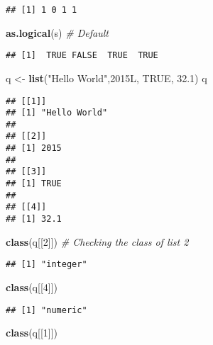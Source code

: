 \documentclass[
]{article}
\newenvironment{Shaded}{\begin{snugshade}}{\end{snugshade}}
\newcommand{\CommentTok}[1]{\textcolor[rgb]{0.56,0.35,0.01}{\textit{#1}}}
\newcommand{\ConstantTok}[1]{\textcolor[rgb]{0.56,0.35,0.01}{#1}}
\newcommand{\DataTypeTok}[1]{\textcolor[rgb]{0.13,0.29,0.53}{#1}}
\newcommand{\DecValTok}[1]{\textcolor[rgb]{0.00,0.00,0.81}{#1}}
\newcommand{\FloatTok}[1]{\textcolor[rgb]{0.00,0.00,0.81}{#1}}
\newcommand{\FunctionTok}[1]{\textcolor[rgb]{0.13,0.29,0.53}{\textbf{#1}}}
\newcommand{\NormalTok}[1]{#1}
\newcommand{\OtherTok}[1]{\textcolor[rgb]{0.56,0.35,0.01}{#1}}
\newcommand{\StringTok}[1]{\textcolor[rgb]{0.31,0.60,0.02}{#1}}
\begin{document}
\begin{verbatim}
## [1] 1 0 1 1
\end{verbatim}

\begin{Shaded}
\begin{Highlighting}[]
\FunctionTok{as.logical}\NormalTok{(s) }\CommentTok{\# Default }
\end{Highlighting}
\end{Shaded}

\begin{verbatim}
## [1]  TRUE FALSE  TRUE  TRUE
\end{verbatim}

\begin{Shaded}
\begin{Highlighting}[]
\NormalTok{q }\OtherTok{\textless{}{-}} \FunctionTok{list}\NormalTok{(}\StringTok{"Hello World"}\NormalTok{,}\DecValTok{2015}\DataTypeTok{L}\NormalTok{, }\ConstantTok{TRUE}\NormalTok{, }\FloatTok{32.1}\NormalTok{)}
\NormalTok{q}
\end{Highlighting}
\end{Shaded}

\begin{verbatim}
## [[1]]
## [1] "Hello World"
## 
## [[2]]
## [1] 2015
## 
## [[3]]
## [1] TRUE
## 
## [[4]]
## [1] 32.1
\end{verbatim}

\begin{Shaded}
\begin{Highlighting}[]
\FunctionTok{class}\NormalTok{(q[[}\DecValTok{2}\NormalTok{]]) }\CommentTok{\# Checking the class of list 2}
\end{Highlighting}
\end{Shaded}

\begin{verbatim}
## [1] "integer"
\end{verbatim}

\begin{Shaded}
\begin{Highlighting}[]
\FunctionTok{class}\NormalTok{(q[[}\DecValTok{4}\NormalTok{]])}
\end{Highlighting}
\end{Shaded}

\begin{verbatim}
## [1] "numeric"
\end{verbatim}

\begin{Shaded}
\begin{Highlighting}[]
\FunctionTok{class}\NormalTok{(q[[}\DecValTok{1}\NormalTok{]])}
\end{Highlighting}
\end{Shaded}
\end{document}
